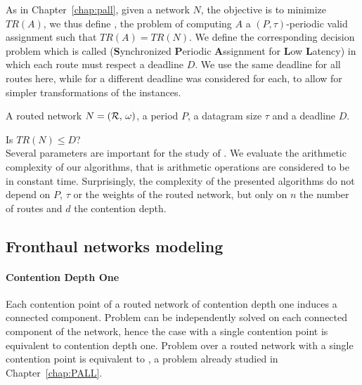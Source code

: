   As in Chapter~\ref{chap:pall}, given a network $N$, the objective is to minimize $TR(A)$, we thus define \minstra, the problem of computing $A$ a $(P,\tau)$-periodic valid assignment such that $TR(A) = TR(N)$. We define the corresponding decision problem which is called \spall (\textbf{S}ynchronized \textbf{P}eriodic \textbf{A}ssignment for \textbf{L}ow \textbf{L}atency) in which each route must respect a deadline $D$. We use the same deadline for all routes here, 
  while for \pall a different deadline was considered for each, to allow for simpler transformations of the instances. 


        A routed network $N = ({\cal R},\,\omega)$, a period $P$, a datagram size $\tau$ and a deadline $D$.%
      

       Is $TR(N) \leq D$?
      \\
    
    Several parameters are important for the study of \spall. We evaluate the arithmetic complexity of our algorithms, that is arithmetic operations are considered to be in constant time. Surprisingly, the complexity of the presented algorithms do not depend on $P$, $\tau$ or the weights of the routed network, but only on $n$ the number of routes and $d$ the contention depth.

\subsection{Fronthaul networks modeling}\label{sec:fronthaul}

\paragraph*{Contention Depth One}

Each contention point of a routed network of contention depth one induces a connected component. 
Problem \spall can be independently solved on each connected component of the network, hence the case with a single contention point is equivalent to contention depth one. Problem \spall over a routed network with a single contention point is equivalent to \wta, a problem already studied in Chapter~\ref{chap:PALL}. 


